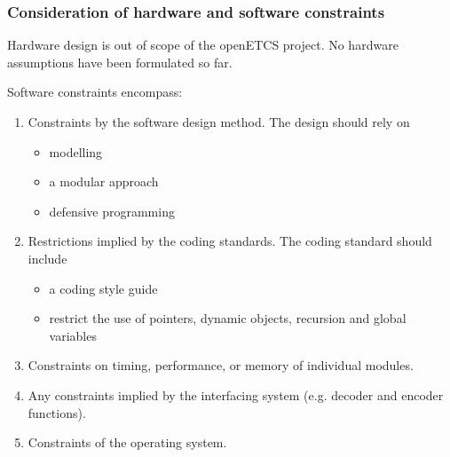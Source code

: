 \subsubsection{Consideration of hardware and software constraints}



Hardware design is out of scope of the openETCS project. 
No hardware assumptions have been formulated so far.

\noindent 
Software constraints encompass:

\begin{enumerate}
   \item Constraints by the software design method. 
         The design should rely on
   \begin{itemize}
   \item modelling
   \item a modular approach
   \item defensive programming
   \end{itemize}

   \item Restrictions implied by the coding standards.
         The coding standard should include
   \begin{itemize}
   \item a coding style guide
   \item restrict the use of pointers, dynamic objects, recursion and global variables
   \end{itemize}

   \item Constraints on timing, performance, or memory of  individual modules.
   \item Any constraints implied by the interfacing system (e.g. decoder and encoder functions).
   \item Constraints of the operating system.
\end{enumerate}



